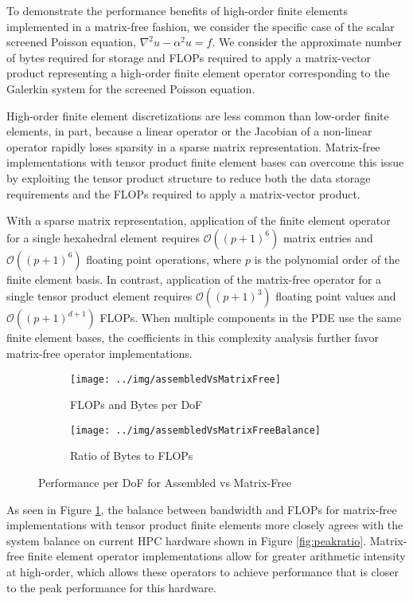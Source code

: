 To demonstrate the performance benefits of high-order finite elements implemented in a matrix-free fashion, we consider the specific case of the scalar screened Poisson equation, $\nabla^2 u - \alpha^2 u = f$.
We consider the approximate number of bytes required for storage and FLOPs required to apply a matrix-vector product representing a high-order finite element operator corresponding to the Galerkin system for the screened Poisson equation.

High-order finite element discretizations are less common than low-order finite elements, in part, because a linear operator or the Jacobian of a non-linear operator rapidly loses sparsity in a sparse matrix representation.
Matrix-free implementations with tensor product finite element bases can overcome this issue by exploiting the tensor product structure to reduce both the data storage requirements and the FLOPs required to apply a matrix-vector product.

With a sparse matrix representation, application of the finite element operator for a single hexahedral element requires $\mathcal{O} \left( \left( p + 1 \right)^6 \right)$ matrix entries and $\mathcal{O} \left( \left( p + 1 \right)^6 \right)$ floating point operations, where $p$ is the polynomial order of the finite element basis.
In contrast, application of the matrix-free operator for a single tensor product element requires $\mathcal{O} \left( \left( p + 1 \right)^3 \right)$ floating point values and $\mathcal{O} \left( \left( p + 1 \right)^{d + 1} \right)$ FLOPs.
When multiple components in the PDE use the same finite element bases, the coefficients in this complexity analysis further favor matrix-free operator implementations.

\begin{figure}[ht!]
\begin{subfigure}{.495\textwidth}
\texttt{[image: ../img/assembledVsMatrixFree]}
\caption{FLOPs and Bytes per DoF}
\end{subfigure}
\begin{subfigure}{.495\textwidth}
\texttt{[image: ../img/assembledVsMatrixFreeBalance]}
\caption{Ratio of Bytes to FLOPs}
\end{subfigure}
\caption{Performance per DoF for Assembled vs Matrix-Free}
\label{fig:assembledvsmatrixfree}
\end{figure}

As seen in Figure \ref{fig:assembledvsmatrixfree}, the balance between bandwidth and FLOPs for matrix-free implementations with tensor product finite elements more closely agrees with the system balance on current HPC hardware shown in Figure \ref{fig:peakratio}.
Matrix-free finite element operator implementations allow for greater arithmetic intensity at high-order, which allows these operators to achieve performance that is closer to the peak performance for this hardware.

